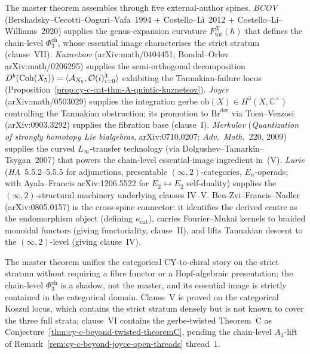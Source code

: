 \begin{remark}
\label{rem:phi-3-cat-proof-architecture}
The master theorem assembles through five external-author spines.
\emph{BCOV} (Bershadsky--Cecotti--Ooguri--Vafa~1994 +
Costello--Li~2012 + Costello--Li--Williams~2020) supplies the
genus-expansion curvature $F^X_{\mathrm{tot}}(\hbar)$ that defines the
chain-level $\Phi_3^{\mathrm{ch}}$, whose essential image
characterises the strict stratum (clause~VII).
\emph{Kuznetsov} (arXiv:math/0404451; Bondal--Orlov
arXiv:math/0206295) supplies the semi-orthogonal decomposition
$D^b(\mathrm{Coh}(X_5)) = \langle \mathcal A_{X_5}, \mathcal O(i)_{i=0}^3
\rangle$ exhibiting the Tannakian-failure locus
(Proposition~\ref{prop:cy-c-cat-thm-A-quintic-kuznetsov}).
\emph{Joyce} (arXiv:math/0503029) supplies the integration gerbe
$\mathrm{ob}(X) \in H^3(X, \mathbb C^\times)$ controlling the
Tannakian obstruction; its promotion to $\mathrm{Br}^{\mathrm{der}}$
via Toen--Vezzosi (arXiv:0903.3292) supplies the fibration base
(clause~I).
\emph{Merkulov} (\emph{Quantization of strongly homotopy Lie
bialgebras}, arXiv:0710.0207; \emph{Adv.\ Math.}~220, 2009) supplies
the curved $L_\infty$-transfer technology (via
Dolgushev--Tamarkin--Tsygan~2007) that powers the chain-level
essential-image ingredient in~(V).
\emph{Lurie} (\emph{HA}~5.5.2--5.5.5 for adjunctions, presentable
$(\infty,2)$-categories, $E_n$-operads; with Ayala--Francis
arXiv:1206.5522 for $E_2 \leftrightarrow E_2$ self-duality) supplies
the $(\infty,2)$-structural machinery underlying clauses IV--V.
Ben-Zvi--Francis--Nadler (arXiv:0805.0157) is the cross-spine
connector: it identifies the derived centre as the endomorphism
object (defining $\kappa_{\mathrm{cat}}$), carries Fourier--Mukai
kernels to braided monoidal functors (giving functoriality, clause~II),
and lifts Tannakian descent to the $(\infty,2)$-level (giving
clause~IV).
\end{remark}

\begin{remark}
\label{rem:phi-3-cat-master-scope}
The master theorem unifies the categorical CY-to-chiral story on the
strict stratum without requiring a fibre functor or a Hopf-algebraic
presentation; the chain-level $\Phi_3^{\mathrm{ch}}$ is a shadow, not
the master, and its essential image is strictly contained in the
categorical domain. Clause~V is proved on the categorical Koszul
locus, which contains the strict stratum densely but is not known to
cover the three full strata; clause~VI contains the gerbe-twisted
Theorem~C as Conjecture~\ref{thm:cy-c-beyond-twisted-theoremC},
pending the chain-level $A_3$-lift of
Remark~\ref{rem:cy-c-beyond-joyce-open-threads} thread~1.
\end{remark}

